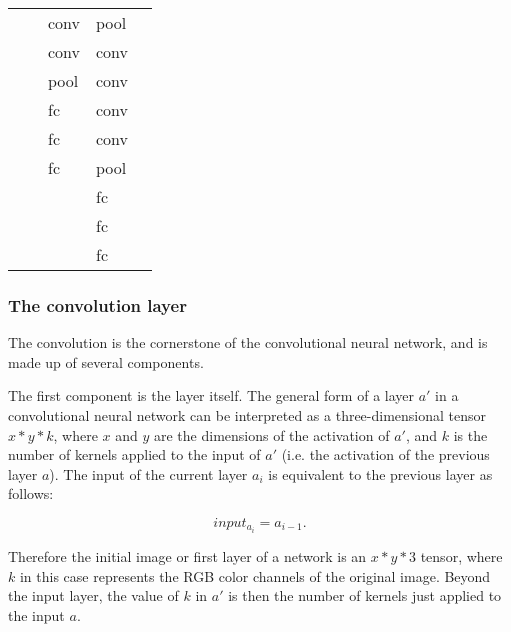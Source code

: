 \begin{table}[]
\begin{tabular}{|l|l|l|l|l}
                &       						& conv                    & pool                    &  \\ \cline{1-4}
                &       						& conv                    & conv                    &  \\ \cline{1-4}
                &       						& pool                    & conv                    &  \\ \cline{1-4}
                &       						& fc                      & conv                    &  \\ \cline{1-4}
                &       						& fc                      & conv                    &  \\ \cline{1-4}
                &       						& fc                      & pool                    &  \\ \cline{1-4}
                &       						&                         & fc                      &  \\ \cline{1-4}
                &       						&                         & fc                      &  \\ \cline{1-4}
                &       						&                         & fc                      &  \\ \cline{1-4}
\end{tabular}
\end{table}

\subsubsection{The convolution layer}
The convolution is the cornerstone of the convolutional neural network, and is made up of several components.

The first component is the layer itself. The general form of a layer $a'$ in a convolutional neural network can be interpreted as a three-dimensional tensor $x*y*k$, where $x$ and $y$ are the dimensions of the activation of $a'$, and $k$ is the number of kernels applied to the input of $a'$ (i.e. the activation of the previous layer $a$). The input of the current layer $a_{i}$ is equivalent to the previous layer as follows:

\begin{equation}
\label{eqn:forward}
input_{a_{i}} = a_{i-1}.
\end{equation}

Therefore the initial image or first layer of a network is an $x*y*3$ tensor, where $k$ in this case represents the RGB color channels of the original image. Beyond the input layer, the value of $k$ in $a'$ is then the number of kernels just applied to the input $a$.

